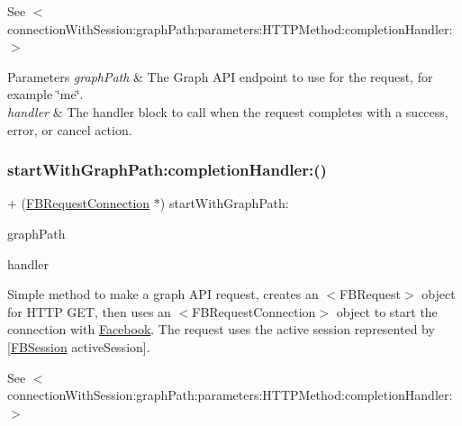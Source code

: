 See $<$connection\+With\+Session\+:graph\+Path\+:parameters\+:\+H\+T\+T\+P\+Method\+:completion\+Handler\+:$>$


\begin{DoxyParams}{Parameters}
{\em graph\+Path} & The Graph A\+PI endpoint to use for the request, for example \char`\"{}me\char`\"{}. \\
\hline
{\em handler} & The handler block to call when the request completes with a success, error, or cancel action. \\
\hline
\end{DoxyParams}
\mbox{\label{interfaceFBRequestConnection_ad5b57e64c614dcb04a71e62ee11a87d5}} 
\subsubsection{\texorpdfstring{start\+With\+Graph\+Path\+:completion\+Handler\+:()}{startWithGraphPath:completionHandler:()}\hspace{0.1cm}{\footnotesize\ttfamily [4/5]}}
{\footnotesize\ttfamily + (\hyperlink{interfaceFBRequestConnection}{F\+B\+Request\+Connection} $\ast$) start\+With\+Graph\+Path\+: \begin{DoxyParamCaption}\item[{(N\+S\+String $\ast$)}]{graph\+Path }\item[{completionHandler:(F\+B\+Request\+Handler)}]{handler }\end{DoxyParamCaption}}

Simple method to make a graph A\+PI request, creates an $<$\+F\+B\+Request$>$ object for H\+T\+TP G\+ET, then uses an $<$\+F\+B\+Request\+Connection$>$ object to start the connection with \hyperlink{interfaceFacebook}{Facebook}. The request uses the active session represented by {\ttfamily \mbox{[}\hyperlink{interfaceFBSession}{F\+B\+Session} active\+Session\mbox{]}}.

See $<$connection\+With\+Session\+:graph\+Path\+:parameters\+:\+H\+T\+T\+P\+Method\+:completion\+Handler\+:$>$


